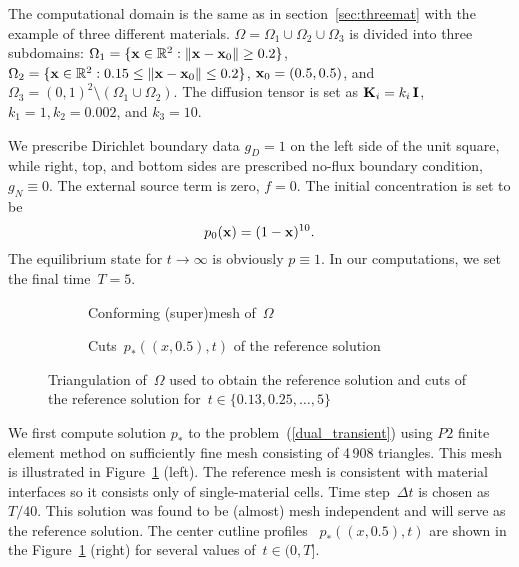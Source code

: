 The computational domain is the same as in section~\ref{sec:threemat} with the example of three different materials. $\Omega = \Omega_1 \cup \Omega_2 \cup \Omega_3$ is divided into three subdomains: $\Omega_1 = \{\boldsymbol{\mathbf{x}} \in {\mathbb R^{2}} : \|{\bf x} - {\bf x}_0\| \ge 0.2\}$,
	$\Omega_2 = \{\boldsymbol{\mathbf{x}} \in {\mathbb R^{2}} : 0.15 \le \|{\bf x} - {\bf x}_0\| \le 0.2\}$, $\boldsymbol{\mathbf{x}}_0 = (0.5, 0.5)$, and $\Omega_3 = (0,1)^2 \setminus (\Omega_1\cup\Omega_2)$. The diffusion tensor is set as $\boldsymbol{\mathbf{K}}_i = k_i\,\boldsymbol{\mathbf{I}}$, $k_1 = 1, k_2 = 0.002$, and $k_3 = 10$.
	
	We prescribe Dirichlet boundary data $g_D = 1$ on the left side of the unit square, while right, top, and bottom sides are prescribed no-flux boundary condition,  $g_N \equiv 0$. The external source term is zero, $f= 0$. The initial concentration is set to be
	\begin{equation*}
		p_0(\boldsymbol{\mathbf{x}}) = (1 - \boldsymbol{\mathbf{x}})^{10}.	
	\end{equation*}
The equilibrium state for $t\to\infty$ is obviously $p \equiv 1$. In our computations, we set the final time~$T = 5$.
	
	
	\begin{figure}[h]
		\centering
		\begin{subfigure}{.4\linewidth}
			\centering
			\caption{Conforming (super)mesh of~$\Omega$}
		\end{subfigure}%
		\hfill
		\begin{subfigure}{.58\linewidth}
			\centering
			\caption{Cuts~$p_*\left((x,0.5), t\right)$ of the reference solution}	
		\end{subfigure}%
\caption{Triangulation of~$\Omega$ used to obtain the reference solution and cuts of the reference solution for~$t \in \{0.13, 0.25, \dots, 5\}$ \label{fig:transient:ref}}
	\end{figure}

	We first compute solution $p_*$ to the problem~(\ref{dual_transient}) using $P2$ finite element method on sufficiently fine mesh consisting of  4\,908 triangles. This mesh is illustrated in Figure~\ref{fig:transient:ref} (left). The reference mesh is consistent with material interfaces so it consists only of single-material cells. Time step~$\Delta t$ is chosen as~$T / 40$. This solution was found to be (almost) mesh independent and will serve as the  reference solution. The center cutline profiles ~$p_*\left((x,0.5), t\right)$   are shown in the Figure~\ref{fig:transient:ref} (right) for several values of~$t \in (0, T]$.
	
